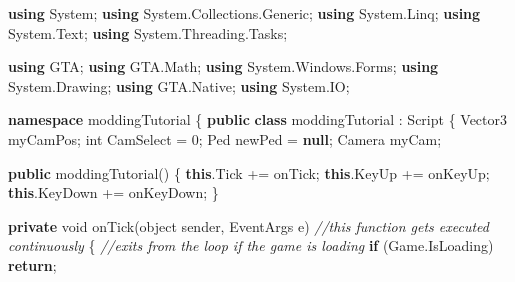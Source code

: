 \documentclass[
  openany]{book}
\newenvironment{Shaded}{\begin{snugshade}}{\end{snugshade}}
\newcommand{\CommentTok}[1]{\textcolor[rgb]{0.56,0.35,0.01}{\textit{#1}}}
\newcommand{\DataTypeTok}[1]{\textcolor[rgb]{0.13,0.29,0.53}{#1}}
\newcommand{\DecValTok}[1]{\textcolor[rgb]{0.00,0.00,0.81}{#1}}
\newcommand{\FunctionTok}[1]{\textcolor[rgb]{0.00,0.00,0.00}{#1}}
\newcommand{\KeywordTok}[1]{\textcolor[rgb]{0.13,0.29,0.53}{\textbf{#1}}}
\newcommand{\NormalTok}[1]{#1}
\begin{document}
\begin{Shaded}
\begin{Highlighting}[]
\KeywordTok{using}\NormalTok{ System;}
\KeywordTok{using}\NormalTok{ System.}\FunctionTok{Collections}\NormalTok{.}\FunctionTok{Generic}\NormalTok{;}
\KeywordTok{using}\NormalTok{ System.}\FunctionTok{Linq}\NormalTok{;}
\KeywordTok{using}\NormalTok{ System.}\FunctionTok{Text}\NormalTok{;}
\KeywordTok{using}\NormalTok{ System.}\FunctionTok{Threading}\NormalTok{.}\FunctionTok{Tasks}\NormalTok{;}

\KeywordTok{using}\NormalTok{ GTA;}
\KeywordTok{using}\NormalTok{ GTA.}\FunctionTok{Math}\NormalTok{;}
\KeywordTok{using}\NormalTok{ System.}\FunctionTok{Windows}\NormalTok{.}\FunctionTok{Forms}\NormalTok{;}
\KeywordTok{using}\NormalTok{ System.}\FunctionTok{Drawing}\NormalTok{;}
\KeywordTok{using}\NormalTok{ GTA.}\FunctionTok{Native}\NormalTok{;}
\KeywordTok{using}\NormalTok{ System.}\FunctionTok{IO}\NormalTok{;}


\KeywordTok{namespace}\NormalTok{ moddingTutorial}
\NormalTok{\{}
    \KeywordTok{public} \KeywordTok{class}\NormalTok{ moddingTutorial : Script}
\NormalTok{    \{}
\NormalTok{        Vector3 myCamPos;}
        \DataTypeTok{int}\NormalTok{ CamSelect = }\DecValTok{0}\NormalTok{;}
\NormalTok{        Ped newPed = }\KeywordTok{null}\NormalTok{;}
\NormalTok{        Camera myCam;}

        \KeywordTok{public} \FunctionTok{moddingTutorial}\NormalTok{()}
\NormalTok{        \{}
            \KeywordTok{this}\NormalTok{.}\FunctionTok{Tick}\NormalTok{ += onTick;}
            \KeywordTok{this}\NormalTok{.}\FunctionTok{KeyUp}\NormalTok{ += onKeyUp;}
            \KeywordTok{this}\NormalTok{.}\FunctionTok{KeyDown}\NormalTok{ += onKeyDown;}
\NormalTok{        \}}

        \KeywordTok{private} \DataTypeTok{void} \FunctionTok{onTick}\NormalTok{(}\DataTypeTok{object}\NormalTok{ sender, EventArgs e) }\CommentTok{//this function gets executed continuously }
\NormalTok{        \{}
            \CommentTok{//exits from the loop if the game is loading}
            \KeywordTok{if}\NormalTok{ (Game.}\FunctionTok{IsLoading}\NormalTok{) }\KeywordTok{return}\NormalTok{;}
            

\end{Highlighting}
\end{Shaded}
\end{document}
